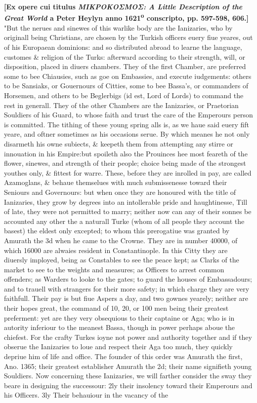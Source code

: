 \documentclass[12pt]{article}
\begin{document}
{		\vskip 12pt
		
		\noindent\textbf{[Ex opere cui titulus \textit{ΜΙΚΡΟΚΟΣΜΟΣ: A Little Description of the Great World} a Peter Heylyn anno 1621\textsuperscript{o} conscripto, pp. 597-598, 606.]} "But the nerues and sinewes of this warlike body are the Ianizaries, who by originall being Christians, are chosen by the Turkish officers euery fiue yeares, out of his Europaean dominions: and so distributed abroad to learne the language, customes \& religion of the Turks: afterward according to their strength, will, or disposition, placed in diuers chambers. They of the first Chamber, are preferred some to bee Chiausies, such as goe on Embassies, and execute iudgements: others to be Sansiaks, or Gouernours of Citties, some to bee Bassa's, or commanders of Horsemen, and others to be Beglerbigs (id est, Lord of Lords) to command the rest in generall. They of the other Chambers are the Ianizaries, or Praetorian Souldiers of his Guard, to whose faith and trust the care of the Emperours person is committed. The tithing of these young spring alls is, as we haue said euery fift yeare, and oftner sometimes as his occasions serue. By which meanes he not only disarmeth his owne subiects, \& keepeth them from attempting any stirre or innouation in his Empire:but spoileth also the Prouinces hee most feareth of the flower, sinewes, and strength of their people; choice being made of the strongest youthes only, \& fittest for warre. These, before they are inrolled in pay, are called Azamoglans, \& behaue themselues with much submissenesse toward their Seniours and Governours: but when once they are honoured with the title of Ianizaries, they grow by degrees into an intollerable pride and haughtinesse, Till of late, they were not permitted to marry; neither now can any of their sonnes be accounted any other the a naturall Turke (whom of all people they account the basest) the eldest only excepted; to whom this prerogatiue was granted by Amurath the 3d when he came to the Crowne. They are in number 40000, of which 16000 are alwaies resident in Constantinople. In this Citty they are diuersly imployed, being as Constables to see the peace kept; as Clarks of the market to see to the weights and measures; as Officers to arrest common offenders; as Warders to looke to the gates; to guard the houses of Embassadours; and to trauell with strangers for their more safety; in which charge they are very faithfull. Their pay is but fiue Aspers a day, and two gownes yearely; neither are their hopes great, the command of 10, 20, or 100 men being their greatest preferment: yet are they very obsequious to their captaine or Aga; who is in autority inferiour to the meanest Bassa, though in power perhaps aboue the chiefest. For the crafty Turkes ioyne not power and authority together and if they obserue the Ianizaries to loue and respect their Aga too much, they quickly depriue him of life and office. The founder of this order was Amurath the first, Ano. 1365; their greatest establisher Amurath the 2d; their name signifieth young Souldiers. Now concerning these Ianizaries, we will farther consider the sway they beare in designing the successour: 2ly their insolency toward their Emperours and his Officers. 3ly Their behauiour in the vacancy of the }
\end{document}
